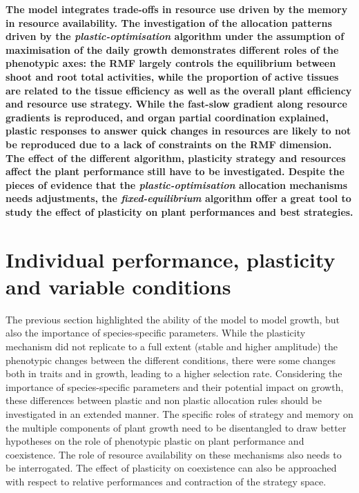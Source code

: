 \textbf{The model \model integrates trade-offs in resource use driven by the memory in resource availability. The investigation of the allocation patterns driven by the \textit{plastic-optimisation}   algorithm under the assumption of maximisation of the daily growth demonstrates different roles of the phenotypic axes: the RMF largely controls the equilibrium between shoot and root total activities, while the proportion of active tissues are related to the tissue efficiency as well as the overall plant efficiency and resource use strategy. While the fast-slow gradient along resource gradients is reproduced, and organ partial coordination explained, plastic responses to answer quick changes in resources are likely to not be reproduced due to a lack of constraints on the RMF dimension. The effect of the different algorithm, plasticity strategy and resources affect the plant performance still have to be investigated. Despite the pieces of evidence that the \textit{plastic-optimisation} allocation mechanisms needs adjustments, the \textit{fixed-equilibrium} algorithm offer a great tool to study the effect of plasticity on plant performances and best strategies.}













\chapter{Individual performance, plasticity and variable conditions}\label{chapter:individual}

The previous section highlighted the ability of the model to model growth, but also the importance of species-specific parameters. While the plasticity mechanism did not replicate to a full extent (stable and higher amplitude) the phenotypic changes between the different conditions, there were some changes both in traits and in growth, leading to a higher selection rate. Considering the importance of species-specific parameters and their potential impact on growth, these differences between plastic and non plastic allocation rules should be investigated in an extended manner. The specific roles of strategy and memory on the multiple components of plant growth need to be disentangled to draw better hypotheses on the role of phenotypic plastic on plant performance and coexistence. The role of resource availability on these mechanisms also needs to be interrogated. The effect of plasticity on coexistence can also be approached with respect to relative performances and contraction of the strategy space.

